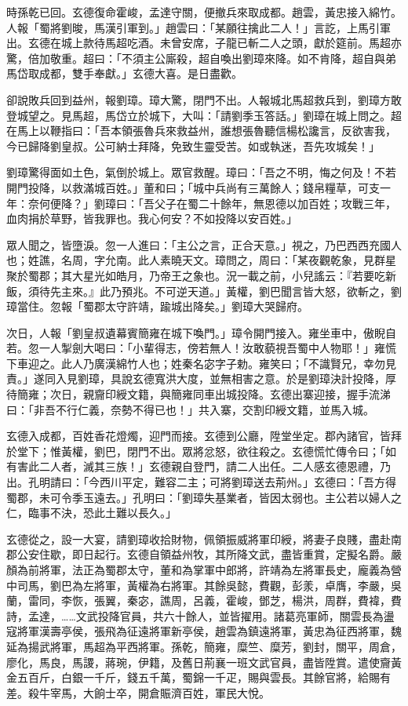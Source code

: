 時孫乾已回。玄德復命霍峻，孟達守關，便撤兵來取成都。趙雲，黃忠接入綿竹。人報「蜀將劉晙，馬漢引軍到。」趙雲曰：「某願往擒此二人！」言訖，上馬引軍出。玄德在城上款待馬超吃酒。未曾安席，子龍已斬二人之頭，獻於筵前。馬超亦驚，倍加敬重。超曰：「不須主公廝殺，超自喚出劉璋來降。如不肯降，超自與弟馬岱取成都，雙手奉獻。」玄德大喜。是日盡歡。

卻說敗兵回到益州，報劉璋。璋大驚，閉門不出。人報城北馬超救兵到，劉璋方敢登城望之。見馬超，馬岱立於城下，大叫：「請劉季玉答話。」劉璋在城上問之。超在馬上以鞭指曰：「吾本領張魯兵來救益州，誰想張魯聽信楊松讒言，反欲害我，今已歸降劉皇叔。公可納士拜降，免致生靈受苦。如或執迷，吾先攻城矣！」

劉璋驚得面如土色，氣倒於城上。眾官救醒。璋曰：「吾之不明，悔之何及！不若開門投降，以救滿城百姓。」董和曰；「城中兵尚有三萬餘人；錢帛糧草，可支一年：奈何便降？」劉璋曰：「吾父子在蜀二十餘年，無恩德以加百姓；攻戰三年，血肉捐於草野，皆我罪也。我心何安？不如投降以安百姓。」

眾人聞之，皆墮淚。忽一人進曰：「主公之言，正合天意。」視之，乃巴西西充國人也；姓譙，名周，字允南。此人素曉天文。璋問之，周曰：「某夜觀乾象，見群星聚於蜀郡；其大星光如皓月，乃帝王之象也。況一載之前，小兒謠云：『若要吃新飯，須待先主來。』此乃預兆。不可逆天道。」黃權，劉巴聞言皆大怒，欲斬之，劉璋當住。忽報「蜀郡太守許靖，踰城出降矣。」劉璋大哭歸府。

次日，人報「劉皇叔遺幕賓簡雍在城下喚門。」璋令開門接入。雍坐車中，傲睨自若。忽一人掣劍大喝曰：「小輩得志，傍若無人！汝敢藐視吾蜀中人物耶！」雍慌下車迎之。此人乃廣漢綿竹人也；姓秦名宓字子勅。雍笑曰；「不識賢兄，幸勿見責。」遂同入見劉璋，具說玄德寬洪大度，並無相害之意。於是劉璋決計投降，厚待簡雍；次日，親齎印綬文籍，與簡雍同車出城投降。玄德出寨迎接，握手流涕曰：「非吾不行仁義，奈勢不得已也！」共入寨，交割印綬文籍，並馬入城。

玄德入成都，百姓香花燈燭，迎門而接。玄德到公廳，陞堂坐定。郡內諸官，皆拜於堂下；惟黃權，劉巴，閉門不出。眾將忿怒，欲往殺之。玄德慌忙傳令曰；「如有害此二人者，滅其三族！」玄德親自登門，請二人出任。二人感玄德恩禮，乃出。孔明請曰：「今西川平定，難容二主；可將劉璋送去荊州。」玄德曰：「吾方得蜀郡，未可令季玉遠去。」孔明曰：「劉璋失基業者，皆因太弱也。主公若以婦人之仁，臨事不決，恐此土難以長久。」

玄德從之，設一大宴，請劉璋收拾財物，佩領振威將軍印綬，將妻子良賤，盡赴南郡公安住歇，即日起行。玄德自領益州牧，其所降文武，盡皆重賞，定擬名爵。嚴顏為前將軍，法正為蜀郡太守，董和為掌軍中郎將，許靖為左將軍長史，龐義為營中司馬，劉巴為左將軍，黃權為右將軍。其餘吳懿，費觀，彭羕，卓膺，李嚴，吳蘭，雷同，李恢，張翼，秦宓，譙周，呂義，霍峻，鄧芝，楊洪，周群，費褘，費詩，孟達，……文武投降官員，共六十餘人，並皆擢用。諸葛亮軍師，關雲長為盪寇將軍漢壽亭侯，張飛為征遠將軍新亭侯，趙雲為鎮遠將軍，黃忠為征西將軍，魏延為揚武將軍，馬超為平西將軍。孫乾，簡雍，糜竺、糜芳，劉封，關平，周倉，廖化，馬良，馬謖，蔣琬，伊籍，及舊日荊襄一班文武官員，盡皆陞賞。遣使齎黃金五百斤，白銀一千斤，錢五千萬，蜀錦一千疋，賜與雲長。其餘官將，給賜有差。殺牛宰馬，大餉士卒，開倉賑濟百姓，軍民大悅。

